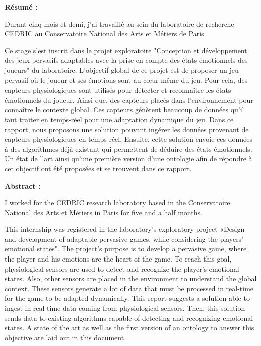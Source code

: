 \documentclass[11pt]{article}
\begin{document}
\newpage
\begin{center}
	\textbf{Résumé :}
\end{center}
\hspace*{0.4cm}
Durant cinq mois et demi, j'ai travaillé au sein du  laboratoire de recherche CEDRIC au Conservatoire National des Arts et Métiers de Paris.\par
Ce stage s'est inscrit dans le projet exploratoire "Conception et développement des jeux pervasifs adaptables avec la prise en compte des états émotionnels des joueurs" du laboratoire. 
L'objectif global de ce projet est de proposer un jeu pervasif où le joueur et ses émotions sont au cœur même du jeu. 
Pour cela, des capteurs physiologiques sont utilisés pour détecter et reconnaître les états émotionnels du joueur. Ainsi que, des capteurs placés dans l'environnement pour connaître le contexte global. 
Ces capteurs génèrent beaucoup de données qu'il faut traiter en temps-réel pour une adaptation dynamique du jeu.
Dans ce rapport, nous proposons une solution pouvant ingérer les données provenant de capteurs physiologiques en temps-réel.
Ensuite, cette solution envoie ces données à des algorithmes déjà existant qui permettent de déduire des états émotionnels.
Un état de l'art ainsi qu'une première version d'une ontologie afin de répondre à cet objectif ont été proposées et se trouvent dans ce rapport.
\vfill
\begin{center}
	\textbf{Abstract :}
\end{center}
\hspace*{0.4cm}
I worked for the CEDRIC research laboratory based in the Conservatoire National des Arts et Métiers in Paris for five and a half months.\par
This internship was registered in the laboratory's exploratory project «Design and development of adaptable pervasive games, while considering the players' emotional states".
The project’s purpose is to develop a pervasive game, where the player and his emotions are the heart of the game.
To reach this goal, physiological sensors are used to detect and recognize the player's emotional states.  Also, other sensors are placed in the environment to understand the global context.
These sensors generate a lot of data that must be processed in real-time for the game to be adapted dynamically. 
This report suggests a solution able to ingest in real-time data coming from physiological sensors.
Then, this solution sends data to existing algorithms capable of detecting and recognizing emotional states.
A state of the art as well as the first version of an ontology to answer this objective are laid out in this document. 
\end{document}
